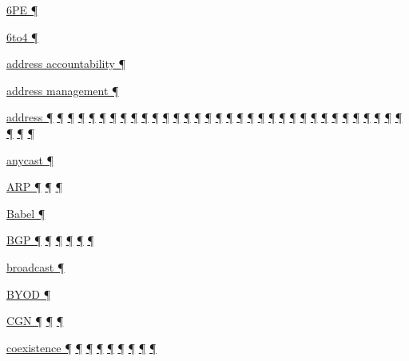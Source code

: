 \documentclass[
]{article}
\begin{document}
\hyperref[tunnels]{6PE ¶}

\hyperref[obsolete-techniques]{6to4 ¶}

\hyperref[address-and-prefix-management]{address accountability ¶}

\hyperref[address-and-prefix-management]{address management ¶}

\hyperref[how-a-user-sees-ipv6]{address ¶}
\hyperref[how-an-application-programmer-sees-ipv6]{¶}
\hyperref[why-version-6]{¶} \hyperref[obsolete-features-in-ipv6]{¶}
\hyperref[ipv6-basic-technology]{¶} \hyperref[address-resolution]{¶}
\hyperref[addresses]{¶} \hyperref[auto-configuration]{¶}
\hyperref[dns]{¶} \hyperref[layer-2-functions]{¶}
\hyperref[managed-configuration]{¶} \hyperref[packet-format]{¶}
\hyperref[routing]{¶}
\hyperref[source-and-destination-address-selection]{¶}
\hyperref[coexistence-with-legacy-ipv4]{¶}
\hyperref[dual-stack-scenarios]{¶}
\hyperref[ipv6-primary-differences-from-ipv4]{¶}
\hyperref[obsolete-techniques]{¶}
\hyperref[translation-and-ipv4-as-a-service]{¶} \hyperref[tunnels]{¶}
\hyperref[security]{¶} \hyperref[filtering]{¶}
\hyperref[layer-2-considerations]{¶} \hyperref[topology-obfuscation]{¶}
\hyperref[network-design]{¶} \hyperref[address-planning]{¶}
\hyperref[prefix-per-host]{¶}
\hyperref[address-and-prefix-management]{¶}
\hyperref[energy-consumption]{¶} \hyperref[multi-prefix-operation]{¶}
\hyperref[multihoming]{¶} \hyperref[cern-and-the-lhc]{¶}
\hyperref[deployment-by-carriers]{¶}
\hyperref[deployment-in-the-enterprise]{¶}
\hyperref[deployment-in-the-home]{¶} \hyperref[tools]{¶}
\hyperref[markdown-usage]{¶}

\hyperref[addresses]{anycast ¶}

\hyperref[address-resolution]{ARP ¶}
\hyperref[ipv6-primary-differences-from-ipv4]{¶}
\hyperref[layer-2-considerations]{¶}

\hyperref[routing]{Babel ¶}

\hyperref[addresses]{BGP ¶} \hyperref[routing]{¶}
\hyperref[further-reading]{¶} \hyperref[filtering]{¶}
\hyperref[multi-prefix-operation]{¶} \hyperref[multihoming]{¶}

\hyperref[ipv6-primary-differences-from-ipv4]{broadcast ¶}

\hyperref[address-and-prefix-management]{BYOD ¶}

\hyperref[dual-stack-scenarios]{CGN ¶} \hyperref[obsolete-techniques]{¶}
\hyperref[tunnels]{¶}

\hyperref[obsolete-features-in-ipv6]{coexistence ¶}
\hyperref[coexistence-with-legacy-ipv4]{¶}
\hyperref[dual-stack-scenarios]{¶} \hyperref[obsolete-techniques]{¶}
\hyperref[translation-and-ipv4-as-a-service]{¶} \hyperref[tunnels]{¶}
\hyperref[network-design]{¶} \hyperref[energy-consumption]{¶}
\hyperref[multihoming]{¶}
\end{document}

